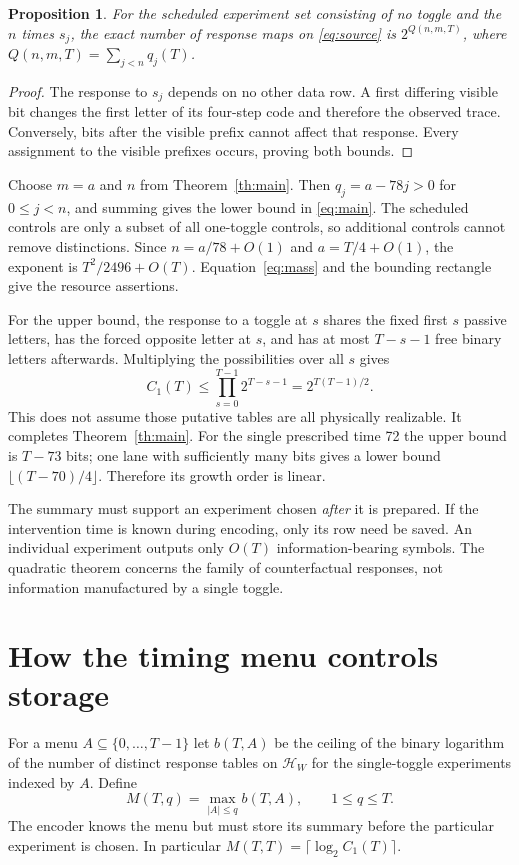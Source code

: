 \documentclass[11pt]{article}
\newtheorem{proposition}[theorem]{Proposition}
\theoremstyle{definition}\newtheorem{definition}[theorem]{Definition}
\newcommand{\HH}{\mathcal H_W}
\begin{document}
\begin{proposition}\label{prop:profile}
For the scheduled experiment set consisting of no toggle and the $n$ times
$s_j$, the exact number of response maps on \eqref{eq:source} is
$2^{Q(n,m,T)}$, where $Q(n,m,T)=\sum_{j<n}q_j(T)$.
\end{proposition}
\begin{proof}
The response to $s_j$ depends on no other data row. A first differing visible
bit changes the first letter of its four-step code and therefore the observed
trace. Conversely, bits after the visible prefix cannot affect that response.
Every assignment to the visible prefixes occurs, proving both bounds.
\end{proof}

Choose $m=a$ and $n$ from Theorem~\ref{th:main}. Then $q_j=a-78j>0$ for
$0\le j<n$, and summing gives the lower bound in \eqref{eq:main}. The scheduled
controls are only a subset of all one-toggle controls, so additional controls
cannot remove distinctions. Since $n=a/78+O(1)$ and $a=T/4+O(1)$, the exponent
is $T^2/2496+O(T)$. Equation~\eqref{eq:mass} and the bounding rectangle give the
resource assertions.

For the upper bound, the response to a toggle at $s$ shares the fixed first $s$
passive letters, has the forced opposite letter at $s$, and has at most $T-s-1$
free binary letters afterwards. Multiplying the possibilities over all $s$ gives
\[
C_1(T)\le\prod_{s=0}^{T-1}2^{T-s-1}=2^{T(T-1)/2}.
\]
This does not assume those putative tables are all physically realizable.
It completes Theorem~\ref{th:main}. For the single prescribed time 72 the upper
bound is $T-73$ bits; one lane with sufficiently many bits gives a lower bound
$\lfloor(T-70)/4\rfloor$. Therefore its growth order is linear.

The summary must support an experiment chosen \emph{after} it is prepared.
If the intervention time is known during encoding, only its row need be saved.
An individual experiment outputs only $O(T)$ information-bearing symbols.
The quadratic theorem concerns the family of counterfactual responses, not
information manufactured by a single toggle.

\section{How the timing menu controls storage}\label{sec:menu}
For a menu $A\subseteq\{0,\ldots,T-1\}$ let $b(T,A)$ be the ceiling of the
binary logarithm of the number of distinct response tables on $\HH$ for the
single-toggle experiments indexed by $A$. Define
\[
 M(T,q)=\max_{|A|\le q}b(T,A),\qquad 1\le q\le T.
\]
The encoder knows the menu but must store its summary before the particular
experiment is chosen. In particular $M(T,T)=\lceil\log_2 C_1(T)\rceil$.
\end{document}
